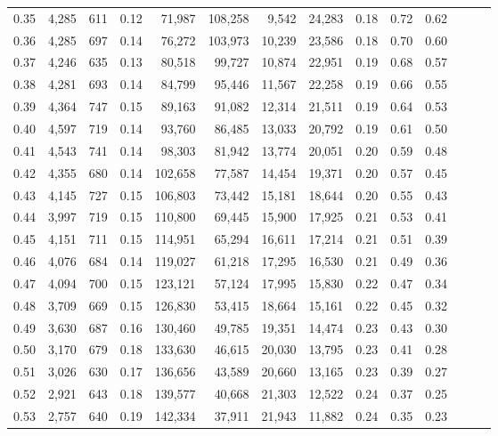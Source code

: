 \begin{tabular}{rrrrrrrrrrrrrr}
0.35 &  4,285 &  611 &  0.12 &   71,987 &  108,258 &   9,542 &  24,283 &  0.18 &  0.72 &      0.62 \\
0.36 &  4,285 &  697 &  0.14 &   76,272 &  103,973 &  10,239 &  23,586 &  0.18 &  0.70 &      0.60 \\
0.37 &  4,246 &  635 &  0.13 &   80,518 &   99,727 &  10,874 &  22,951 &  0.19 &  0.68 &      0.57 \\
0.38 &  4,281 &  693 &  0.14 &   84,799 &   95,446 &  11,567 &  22,258 &  0.19 &  0.66 &      0.55 \\
0.39 &  4,364 &  747 &  0.15 &   89,163 &   91,082 &  12,314 &  21,511 &  0.19 &  0.64 &      0.53 \\
0.40 &  4,597 &  719 &  0.14 &   93,760 &   86,485 &  13,033 &  20,792 &  0.19 &  0.61 &      0.50 \\
0.41 &  4,543 &  741 &  0.14 &   98,303 &   81,942 &  13,774 &  20,051 &  0.20 &  0.59 &      0.48 \\
0.42 &  4,355 &  680 &  0.14 &  102,658 &   77,587 &  14,454 &  19,371 &  0.20 &  0.57 &      0.45 \\
0.43 &  4,145 &  727 &  0.15 &  106,803 &   73,442 &  15,181 &  18,644 &  0.20 &  0.55 &      0.43 \\
0.44 &  3,997 &  719 &  0.15 &  110,800 &   69,445 &  15,900 &  17,925 &  0.21 &  0.53 &      0.41 \\
0.45 &  4,151 &  711 &  0.15 &  114,951 &   65,294 &  16,611 &  17,214 &  0.21 &  0.51 &      0.39 \\
0.46 &  4,076 &  684 &  0.14 &  119,027 &   61,218 &  17,295 &  16,530 &  0.21 &  0.49 &      0.36 \\
0.47 &  4,094 &  700 &  0.15 &  123,121 &   57,124 &  17,995 &  15,830 &  0.22 &  0.47 &      0.34 \\
0.48 &  3,709 &  669 &  0.15 &  126,830 &   53,415 &  18,664 &  15,161 &  0.22 &  0.45 &      0.32 \\
0.49 &  3,630 &  687 &  0.16 &  130,460 &   49,785 &  19,351 &  14,474 &  0.23 &  0.43 &      0.30 \\
0.50 &  3,170 &  679 &  0.18 &  133,630 &   46,615 &  20,030 &  13,795 &  0.23 &  0.41 &      0.28 \\
0.51 &  3,026 &  630 &  0.17 &  136,656 &   43,589 &  20,660 &  13,165 &  0.23 &  0.39 &      0.27 \\
0.52 &  2,921 &  643 &  0.18 &  139,577 &   40,668 &  21,303 &  12,522 &  0.24 &  0.37 &      0.25 \\
0.53 &  2,757 &  640 &  0.19 &  142,334 &   37,911 &  21,943 &  11,882 &  0.24 &  0.35 &      0.23 \\

\end{tabular}
